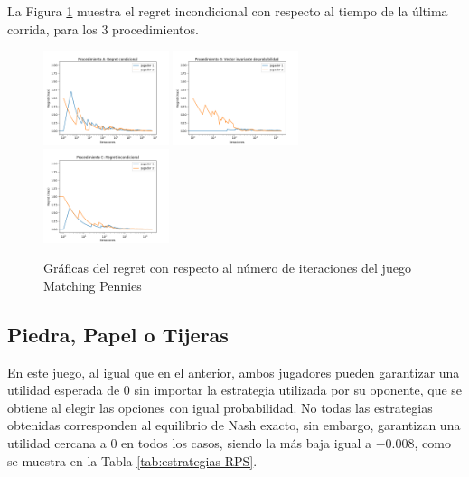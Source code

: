 La Figura \ref{fig:regret-matching-pennies} muestra el regret incondicional con respecto al tiempo de la última corrida, para los $3$ procedimientos.

\begin{figure}[ht]
\caption{Gráficas del regret con respecto al número de iteraciones del juego Matching Pennies}
\label{fig:regret-matching-pennies}
\centering
\includegraphics[width=0.327\textwidth]{graficas/matching-pennies/procedimiento-A.png}
\includegraphics[width=0.327\textwidth]{graficas/matching-pennies/procedimiento-B.png}
\includegraphics[width=0.327\textwidth]{graficas/matching-pennies/procedimiento-C.png}
\end{figure}

\subsection{Piedra, Papel o Tijeras}

En este juego, al igual que en el anterior, ambos jugadores pueden garantizar una utilidad esperada de $0$ sin importar la estrategia utilizada por su oponente, que se obtiene al elegir las opciones con igual probabilidad. No todas las estrategias obtenidas corresponden al equilibrio de Nash exacto, sin embargo, garantizan una utilidad cercana a $0$ en todos los casos, siendo la más baja igual a $-0.008$, como se muestra en la Tabla \ref{tab:estrategias-RPS}.

